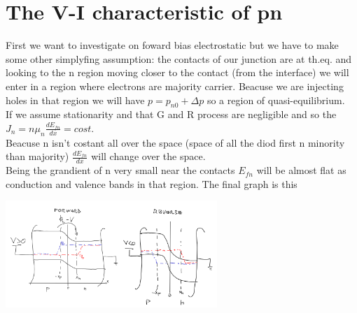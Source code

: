 \section{The V-I characteristic of pn }
First we want to investigate on foward bias electrostatic but we have to make some other simplyfing assumption: the contacts of our junction are at th.eq. and looking to the n region moving closer to the contact (from the interface) we will enter in a region where electrons are majority carrier. Beacuse we are injecting holes in that region we will have $p=p_{n0}+\Delta p$ so a region of quasi-equilibrium.\\
If we assume stationarity and that G and R process are negligible and so the $J_n=n\mu_n \frac{dE_{fn}}{dx}=cost$. \\
Beacuse n isn't costant all over the space (space of all the diod first n minority than majority) $\frac{dE_{fn}}{dx}$ will change over the space.\\
Being the grandient of n very small near the contacts $E_{fn}$ will be almost flat as conduction and valence bands in that region.
The final graph is this 

\centering
\includegraphics[width=0.6\textwidth]{pn9.png}\\
\raggedright

